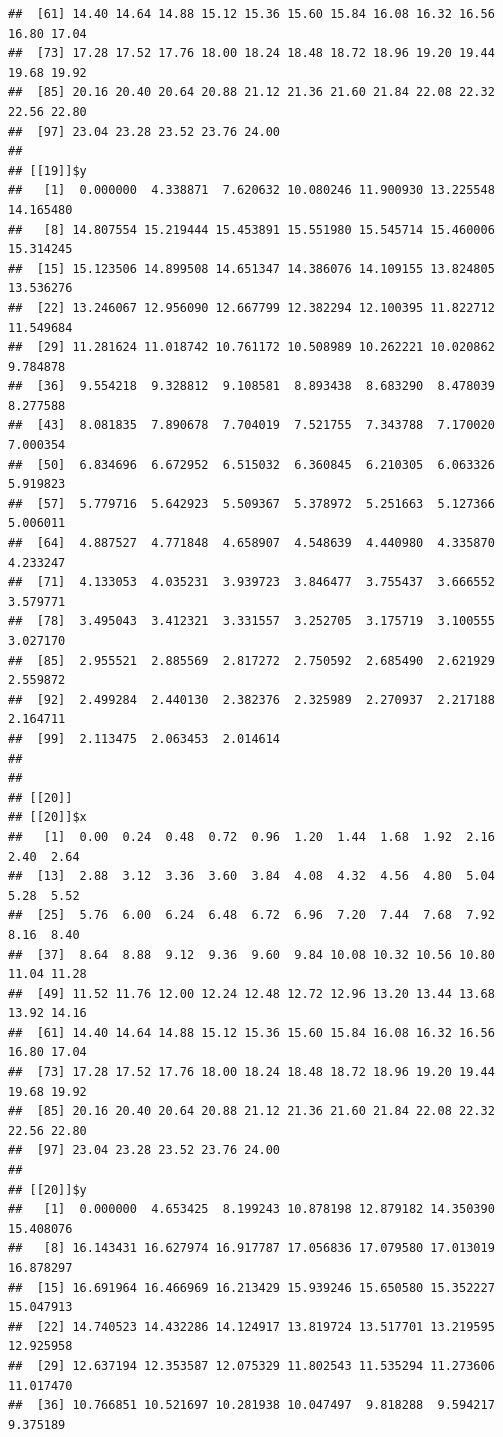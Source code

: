 \documentclass[
  ignorenonframetext,
]{beamer}
\begin{document}
\begin{frame}[fragile]{}
\begin{verbatim}
##  [61] 14.40 14.64 14.88 15.12 15.36 15.60 15.84 16.08 16.32 16.56 16.80 17.04
##  [73] 17.28 17.52 17.76 18.00 18.24 18.48 18.72 18.96 19.20 19.44 19.68 19.92
##  [85] 20.16 20.40 20.64 20.88 21.12 21.36 21.60 21.84 22.08 22.32 22.56 22.80
##  [97] 23.04 23.28 23.52 23.76 24.00
## 
## [[19]]$y
##   [1]  0.000000  4.338871  7.620632 10.080246 11.900930 13.225548 14.165480
##   [8] 14.807554 15.219444 15.453891 15.551980 15.545714 15.460006 15.314245
##  [15] 15.123506 14.899508 14.651347 14.386076 14.109155 13.824805 13.536276
##  [22] 13.246067 12.956090 12.667799 12.382294 12.100395 11.822712 11.549684
##  [29] 11.281624 11.018742 10.761172 10.508989 10.262221 10.020862  9.784878
##  [36]  9.554218  9.328812  9.108581  8.893438  8.683290  8.478039  8.277588
##  [43]  8.081835  7.890678  7.704019  7.521755  7.343788  7.170020  7.000354
##  [50]  6.834696  6.672952  6.515032  6.360845  6.210305  6.063326  5.919823
##  [57]  5.779716  5.642923  5.509367  5.378972  5.251663  5.127366  5.006011
##  [64]  4.887527  4.771848  4.658907  4.548639  4.440980  4.335870  4.233247
##  [71]  4.133053  4.035231  3.939723  3.846477  3.755437  3.666552  3.579771
##  [78]  3.495043  3.412321  3.331557  3.252705  3.175719  3.100555  3.027170
##  [85]  2.955521  2.885569  2.817272  2.750592  2.685490  2.621929  2.559872
##  [92]  2.499284  2.440130  2.382376  2.325989  2.270937  2.217188  2.164711
##  [99]  2.113475  2.063453  2.014614
## 
## 
## [[20]]
## [[20]]$x
##   [1]  0.00  0.24  0.48  0.72  0.96  1.20  1.44  1.68  1.92  2.16  2.40  2.64
##  [13]  2.88  3.12  3.36  3.60  3.84  4.08  4.32  4.56  4.80  5.04  5.28  5.52
##  [25]  5.76  6.00  6.24  6.48  6.72  6.96  7.20  7.44  7.68  7.92  8.16  8.40
##  [37]  8.64  8.88  9.12  9.36  9.60  9.84 10.08 10.32 10.56 10.80 11.04 11.28
##  [49] 11.52 11.76 12.00 12.24 12.48 12.72 12.96 13.20 13.44 13.68 13.92 14.16
##  [61] 14.40 14.64 14.88 15.12 15.36 15.60 15.84 16.08 16.32 16.56 16.80 17.04
##  [73] 17.28 17.52 17.76 18.00 18.24 18.48 18.72 18.96 19.20 19.44 19.68 19.92
##  [85] 20.16 20.40 20.64 20.88 21.12 21.36 21.60 21.84 22.08 22.32 22.56 22.80
##  [97] 23.04 23.28 23.52 23.76 24.00
## 
## [[20]]$y
##   [1]  0.000000  4.653425  8.199243 10.878198 12.879182 14.350390 15.408076
##   [8] 16.143431 16.627974 16.917787 17.056836 17.079580 17.013019 16.878297
##  [15] 16.691964 16.466969 16.213429 15.939246 15.650580 15.352227 15.047913
##  [22] 14.740523 14.432286 14.124917 13.819724 13.517701 13.219595 12.925958
##  [29] 12.637194 12.353587 12.075329 11.802543 11.535294 11.273606 11.017470
##  [36] 10.766851 10.521697 10.281938 10.047497  9.818288  9.594217  9.375189

\end{verbatim}
\end{frame}
\end{document}
